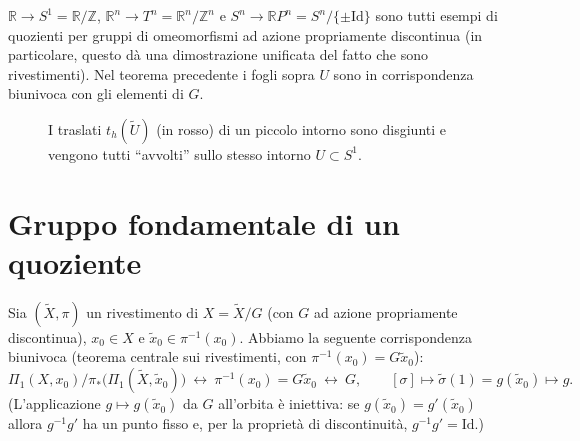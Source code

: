 \begin{observacion}
$\mathbb{R} \to S^1 = \mathbb{R}/\mathbb{Z}$, $\mathbb{R}^n \to T^n = \mathbb{R}^n/\mathbb{Z}^n$ e $S^n \to \mathbb{R}P^n = S^n/\{\pm \mathrm{Id}\}$ sono tutti esempi di quozienti per gruppi di omeomorfismi ad azione propriamente discontinua (in particolare, questo d\`a una dimostrazione unificata del fatto che sono rivestimenti). Nel teorema precedente i fogli sopra $U$ sono in corrispondenza biunivoca con gli elementi di $G$.
\end{observacion}

\begin{figure}[H]
    \centering
    \caption{I traslati $t_h(\widetilde{U})$ (in rosso) di un piccolo intorno sono disgiunti e vengono tutti ``avvolti'' sullo stesso intorno $U \subset S^1$.}
\end{figure}

\section{Gruppo fondamentale di un quoziente}

Sia $(\widetilde{X}, \pi)$ un rivestimento di $X = \widetilde{X}/G$ (con $G$ ad azione propriamente discontinua), $x_0 \in X$ e $\widetilde{x}_0 \in \pi^{-1}(x_0)$. Abbiamo la seguente corrispondenza biunivoca (teorema centrale sui rivestimenti, con $\pi^{-1}(x_0) = G\widetilde{x}_0$):
\[
\Pi_1(X, x_0) \big/ \pi_*\big(\Pi_1(\widetilde{X}, \widetilde{x}_0)\big) \ \longleftrightarrow\ \pi^{-1}(x_0) = G\widetilde{x}_0 \ \longleftrightarrow\ G, \qquad [\sigma] \mapsto \widetilde{\sigma}(1) = g(\widetilde{x}_0) \mapsto g .
\]
(L'applicazione $g \mapsto g(\widetilde{x}_0)$ da $G$ all'orbita \`e iniettiva: se $g(\widetilde{x}_0) = g'(\widetilde{x}_0)$ allora $g^{-1}g'$ ha un punto fisso e, per la propriet\`a di discontinuit\`a, $g^{-1}g' = \mathrm{Id}$.)

